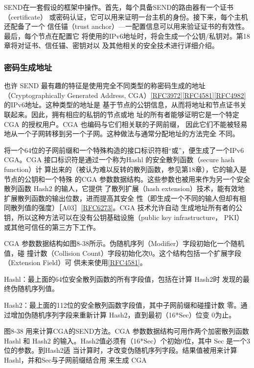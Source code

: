 SEND在一套假设的框架中操作。首先，每个具备SEND的路由器有一个证书
（certificate） 或密码认证，它可以用来证明一台主机的身份。接下来，每个主机还配备了一个
信任锚（trust anchor）—一配置信息可以用来验证证书的有效性。最后，每个节点在配置它
将使用的IPv6地址时，将会生成一个公钥/私钥对。第18章将对证书、信任锚、密钥对以
及其他相关的安全技术进行详细介绍。

\subsubsection{密码生成地址}
也许 SEND 最有趣的特征是使用完全不同类型的称密码生成的地址（Cryptographically
Generated Address, CGA）\href{https://www.rfc-editor.org/rfc/rfc3972}{[RFC3972]}\href{https://www.rfc-editor.org/rfc/rfc4581}{[RFC4581]}\href{https://www.rfc-editor.org/rfc/rfc4982}{[RFC4982]} 的IPv6地址。这种类型的地址是
基于节点的公钥信息，从而将地址和节点证书关联起来。因此，拥有相应的私钥的节点或地
址的所有者能够证明它是一个特定CGA 的授权用户。CGA 也编码与它们相关联的子网前缀，
因此它们不能被轻易地从一个子网转移到另一个子网。这种做法与通常分配地址的方法完全
不同。

将一个64位的子网前缀和一个特殊构造的接口标识符相“或”，便生成了一个IPv6
CGA。CGA 接口标识符是通过一个称为Hashl 的安全散列函数（secure hash function）计
算出来的（被认为难以反转的散列函数，参见第18章），它的输入是节点的公钥和一个特殊
的CGA 参数数据结构。这些参数也被用来作为另一个安全散列函数 Hash2 的输人，它提供
了散列扩展（hash extension）技术，能有效地扩展散列函数的输出位数，进而提高其安全
性（即生成一个不同的输人但却有相同散列值的强度）［A03］\href{https://www.rfc-editor.org/rfc/rfc6273}{[RFC6273]}。CGA 技术允许自动
生成地址所有者的公钥，所以这种方法可以在没有公钥基础设施（public key infrastructure，
PKI） 或其他可信任的第三方下工作。

CGA 参数数据结构如图8-38所示。伪随机序列（Modifier）字段初始化一个随机值，碰
撞计数（Collision Count）字段初始化次0。这个结构包括一个扩展字段（Extension Field）可
供未来使用\href{https://www.rfc-editor.org/rfc/rfc4581}{[RFC4581]}。

 Hashl：最上面的64位安全散列函数的所有字段值，包括在计算 Hash2时
发现的最终伪随机序列值。

Hash2：最上面的112位的安全散列函数字段值，其中子网前缀和碰撞计数
零。通过增加伪随机序列字段来重新计算 Hash2，直到最初（16*Sec）位变
0为止。

图8-38 用来计算CGA的SEND方法。CGA 参数数据结构可用作两个加密散列函数 Hashl 和 Hash2
的输入。Hash2值必须有（16*Sec）个初始0位，其中 Sec 是一个3位的参数。到Hash2适
当计算时，才改变伪随机序列字段。结果值被用来计算 Hashl，并和Sec与子网前缀结合用
来生成 CGA

